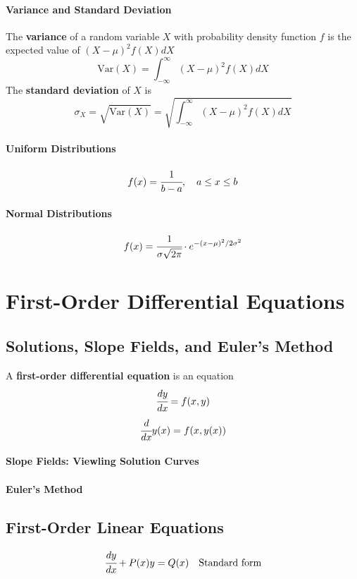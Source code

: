 \documentclass{article}
\begin{document}
            \paragraph{Variance and Standard Deviation} The \textbf{variance} of a random variable $X$ with probability density function $f$ is the expected value of $(X-\mu)^2f(X)dX$
            \[\text{Var}(X)=\int_{-\infty}^\infty(X-\mu)^2f(X)dX\]
            The \textbf{standard deviation} of $X$ is
            \[\sigma_X=\sqrt{\text{Var}(X)}=\sqrt{\int_{-\infty}^\infty(X-\mu)^2f(X)dX}\]
            \paragraph{Uniform Distributions}
            \[f(x)=\cfrac{1}{b-a},\quad a\le x\le b\]
            \paragraph{Normal Distributions}
            \[f(x)=\cfrac{1}{\sigma\sqrt{2\pi}}\cdot e^{-(x-\mu)^2/2\sigma^2}\]
    
    \newpage
    \section{First-Order Differential Equations}
        \subsection{Solutions, Slope Fields, and Euler's Method}
        A \textbf{first-order differential equation} is an equation
        \[\cfrac{dy}{dx}=f(x,y)\]
        \[\cfrac{d}{dx}y(x)=f(x,y(x))\]
            \paragraph{Slope Fields: Viewling Solution Curves}
            \paragraph{Euler's Method}
        \subsection{First-Order Linear Equations}
            \[\cfrac{dy}{dx}+P(x)y=Q(x)\quad \text{Standard form}\]
\end{document}
